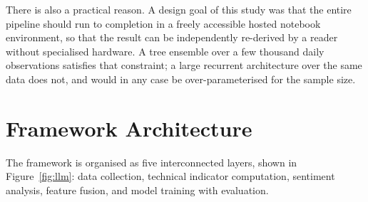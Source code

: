 There is also a practical reason. A design goal of this study was that the entire pipeline should
run to completion in a freely accessible hosted notebook environment, so that the result can be
independently re-derived by a reader without specialised hardware. A tree ensemble over a
few thousand daily observations satisfies that constraint; a large recurrent architecture over
the same data does not, and would in any case be over-parameterised for the sample size.

\section{Framework Architecture}
\label{sec:llm-arch}

The framework is organised as five interconnected layers, shown in Figure~\ref{fig:llm}: data
collection, technical indicator computation, sentiment analysis, feature fusion, and model
training with evaluation.

